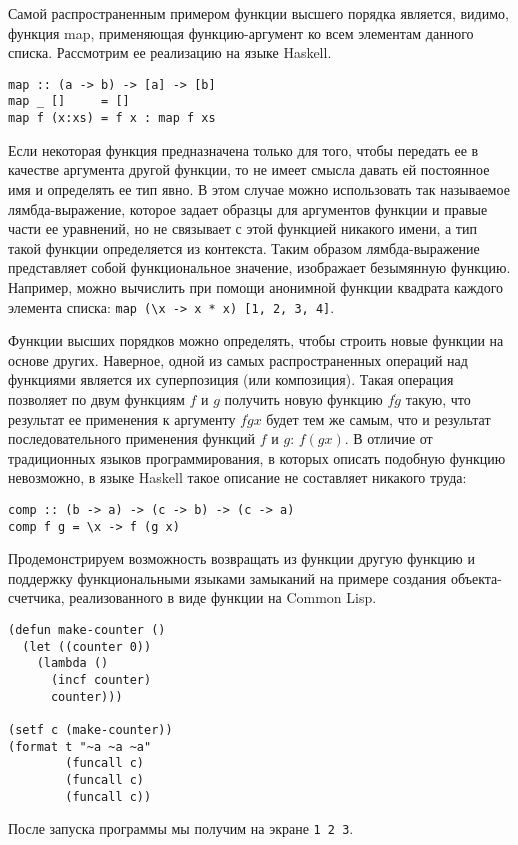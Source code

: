 \documentclass[a4paper]{article}
\begin{document}
Самой распространенным примером функции высшего порядка является,
видимо, функция map, применяющая функцию-аргумент ко всем элементам
данного списка. Рассмотрим ее реализацию на языке Haskell.

\begin{verbatim}
map :: (a -> b) -> [a] -> [b]
map _ []     = []
map f (x:xs) = f x : map f xs
\end{verbatim}


Если некоторая функция предназначена только для того, чтобы передать
ее в качестве аргумента другой функции, то не имеет смысла давать ей
постоянное имя и определять ее тип явно. В этом случае можно
использовать так называемое лямбда-выражение, которое задает образцы
для аргументов функции и правые части ее уравнений, но не связывает с
этой функцией никакого имени, а тип такой функции определяется из
контекста. Таким образом лямбда-выражение представляет собой
функциональное значение, изображает безымянную функцию. Например,
можно вычислить при помощи анонимной функции квадрата каждого
элемента списка: \verb|map (\x -> x * x) [1, 2, 3, 4]|.

Функции высших порядков можно определять, чтобы строить новые функции
на основе других. Наверное, одной из самых распространенных операций
над функциями является их суперпозиция (или композиция). Такая
операция позволяет по двум функциям $f$ и $g$ получить новую функцию
$f \dot g$ такую, что результат ее применения к аргументу $f\dot g x$
будет тем же самым, что и результат последовательного применения
функций $f$ и $g$: $f (g x)$. В отличие от традиционных языков
программирования, в которых описать подобную функцию невозможно, в
языке Haskell такое описание не составляет никакого труда:

\begin{verbatim}
comp :: (b -> a) -> (c -> b) -> (c -> a)
comp f g = \x -> f (g x)
\end{verbatim}

Продемонстрируем возможность возвращать из функции другую функцию
и поддержку функциональными языками замыканий на примере создания
объекта-счетчика, реализованного в виде функции на Common Lisp.

\begin{verbatim}
(defun make-counter ()
  (let ((counter 0))
    (lambda ()
      (incf counter)
      counter)))

(setf c (make-counter))
(format t "~a ~a ~a"
        (funcall c)
        (funcall c)
        (funcall c))
\end{verbatim}
После запуска программы мы получим на экране \verb|1 2 3|.
\end{document}
